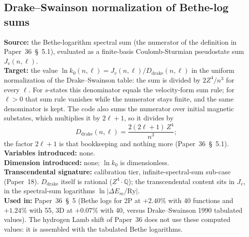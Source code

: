 \documentclass[11pt]{article}
\begin{document}
\subsection{Drake--Swainson normalization of Bethe-log sums}
\label{sec:proj_drake_swainson}
\textbf{Source:} the Bethe-logarithm spectral sum (the numerator of
the definition in Paper~36~\S~5.1), evaluated as a finite-basis Coulomb-Sturmian
pseudostate sum $J_v(n,\ell)$.\\
\textbf{Target:} the value
$\ln k_0(n,\ell) = J_v(n,\ell) / D_{\text{drake}}(n,\ell)$ in the uniform
normalization of the Drake--Swainson table: the sum is divided by
$2Z^4/n^3$ for every $\ell$.  For $s$-states this denominator equals the
velocity-form sum rule; for $\ell > 0$ that sum rule vanishes while the
numerator stays finite, and the same denominator is kept.  The code also
sums the numerator over initial magnetic substates, which multiplies it
by $2\ell+1$, so it divides by
\[
  D_{\text{drake}}(n,\ell) = \frac{2(2\ell + 1)\,Z^4}{n^3};
\]
the factor $2\ell+1$ is that bookkeeping and nothing more
(Paper~36~\S~5.1).\\
\textbf{Variables introduced:} none.\\
\textbf{Dimension introduced:} none; $\ln k_0$ is dimensionless.\\
\textbf{Transcendental signature:} calibration tier, infinite-spectral-sum sub-case (Paper~18).
$D_{\text{drake}}$ itself is rational ($Z^4 \cdot \mathbb{Q}$); the
transcendental content sits in $J_v$, in the spectral-sum
logarithms $\ln |\Delta E_m / \mathrm{Ry}|$.\\
\textbf{Used in:} Paper~36~\S~5 (Bethe logs for 2P at $+2.40\%$ with
40 functions and $+1.24\%$ with 55, 3D at $+0.07\%$ with 40, versus
Drake--Swainson 1990 tabulated values).  The hydrogen Lamb shift of
Paper~36 does not use these computed values: it is assembled with the
tabulated Bethe logarithms.
\end{document}
